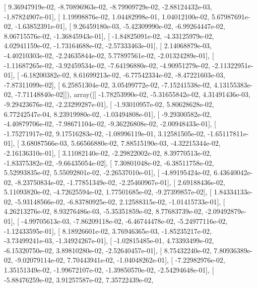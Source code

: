 \documentclass{article}
\begin{document}
       [  9.36947919e-02,  -8.70896963e-02,  -8.79909729e-02,
         -2.88124432e-03,  -1.87824907e-01],
       [  1.19998876e-02,   1.04482998e-01,   1.04012100e-02,
          5.67987691e-02,  -1.63852391e-01],
       [  9.26459180e-03,  -5.42309990e-02,  -6.99264447e-02,
          8.06715576e-02,  -1.36845943e-01],
       [ -1.84825091e-02,  -4.33125979e-02,   4.02941159e-02,
         -1.73164688e-02,  -2.57333463e-01],
       [  2.14068879e-03,  -4.40210303e-02,  -2.24635844e-02,
          5.77897561e-02,  -2.01324289e-01],
       [ -1.11687265e-02,  -3.92459534e-02,  -7.64196880e-02,
         -4.90951279e-02,  -2.11322951e-01],
       [ -6.18200382e-02,   8.61699213e-02,  -6.77542334e-02,
         -8.47221603e-03,  -7.87311099e-02],
       [  6.25851304e-02,   3.05499772e-02,  -7.15241538e-02,
          4.13155383e-02,  -7.71148840e-02]]), array([[ -1.78253990e-02,  -5.31655842e-02,   4.31491436e-03,
         -9.29423676e-02,  -2.23299287e-01],
       [ -1.93010957e-02,   5.80628628e-02,   6.77242547e-04,
          8.23919980e-02,  -1.03494808e-01],
       [ -9.29300582e-02,  -4.40879706e-02,  -7.98671104e-02,
         -9.36226808e-02,  -2.00948433e-01],
       [ -1.75271917e-02,   9.17516283e-02,  -1.08996119e-01,
          3.12581505e-02,  -1.65117811e-01],
       [  3.68087566e-03,   5.66566880e-02,   7.88515190e-03,
         -4.32215344e-02,  -2.16136310e-01],
       [  3.11082140e-02,  -2.29822002e-02,   8.39770513e-02,
         -1.83375382e-02,  -9.66435054e-02],
       [  7.30801048e-02,  -6.38511758e-02,   5.52993835e-02,
          5.55092801e-02,  -2.26537010e-01],
       [ -4.89195424e-02,   6.43640042e-02,  -8.23750834e-02,
         -1.77851349e-02,  -2.25460967e-01],
       [  2.69188436e-02,   5.11093820e-02,  -4.72625594e-02,
          1.77501685e-02,  -9.27399857e-02],
       [  1.84334133e-02,  -5.93148566e-02,  -6.83780925e-02,
          2.12588315e-02,  -1.01415733e-01],
       [  4.26213276e-02,   8.93276486e-03,  -5.35351859e-02,
          8.77683739e-02,  -2.09492879e-01],
       [ -4.99705613e-03,  -7.86209118e-02,  -6.46744478e-02,
         -5.24977116e-02,  -1.12433595e-01],
       [  8.18926601e-02,   3.76946365e-03,  -1.85235217e-02,
         -3.73499241e-03,  -1.34924267e-01],
       [ -1.02815485e-01,   4.73393499e-02,  -6.15320750e-02,
          3.89810280e-02,  -2.52640457e-01],
       [  8.75432240e-02,   7.80936389e-02,  -9.02079114e-02,
          7.70443941e-02,  -1.04048262e-01],
       [ -7.22982976e-02,   1.35151349e-02,  -1.99672107e-02,
         -1.39850570e-02,  -2.54294648e-01],
       [ -5.88476259e-02,   3.91257587e-02,   7.35722439e-02,
\end{document}
